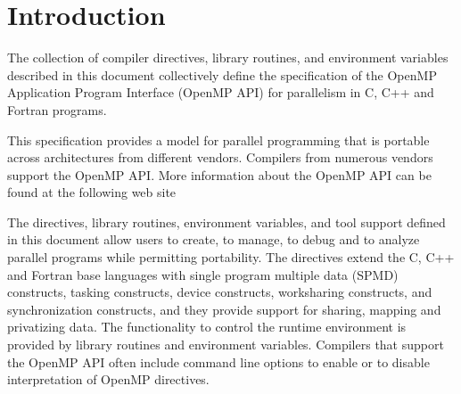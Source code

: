 \chapter{Introduction}
\label{chap:introduction}
The collection of compiler directives, library routines, and environment
variables described in this document collectively define the specification of
the OpenMP Application Program Interface (OpenMP API) for parallelism in C, C++
and Fortran programs.

This specification provides a model for parallel programming that is portable
across architectures from different vendors. Compilers from numerous vendors
support the OpenMP API. More information about the OpenMP API can be found at
the following web site


The directives, library routines, environment variables, and tool support
defined in this document allow users to create, to manage, to debug and to
analyze parallel programs while permitting portability. The directives extend
the C, C++ and Fortran base languages with single program multiple
data (SPMD) constructs, tasking constructs, device constructs, worksharing
constructs, and synchronization constructs, and they provide support for
sharing, mapping and privatizing data. The functionality to control the
runtime environment is provided by library routines and environment
variables. Compilers that support the OpenMP API often include command line
options to enable or to disable interpretation of OpenMP directives.












